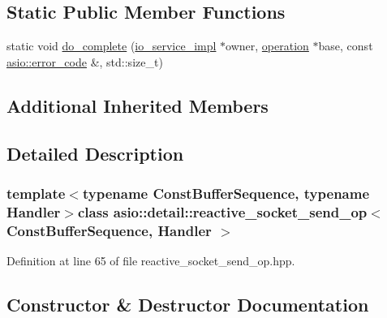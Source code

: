 \subsection*{Static Public Member Functions}
\begin{DoxyCompactItemize}
\item 
static void \hyperlink{classasio_1_1detail_1_1reactive__socket__send__op_a58c8c98f85f44f3c21374280dd473802}{do\+\_\+complete} (\hyperlink{namespaceasio_1_1detail_a6d61d9b8e53c11288be549d82aec5a42}{io\+\_\+service\+\_\+impl} $\ast$owner, \hyperlink{namespaceasio_1_1detail_a338968609bec20e37145309f8f9ec936}{operation} $\ast$base, const \hyperlink{classasio_1_1error__code}{asio\+::error\+\_\+code} \&, std\+::size\+\_\+t)
\end{DoxyCompactItemize}
\subsection*{Additional Inherited Members}


\subsection{Detailed Description}
\subsubsection*{template$<$typename Const\+Buffer\+Sequence, typename Handler$>$class asio\+::detail\+::reactive\+\_\+socket\+\_\+send\+\_\+op$<$ Const\+Buffer\+Sequence, Handler $>$}



Definition at line 65 of file reactive\+\_\+socket\+\_\+send\+\_\+op.\+hpp.



\subsection{Constructor \& Destructor Documentation}
\hypertarget{classasio_1_1detail_1_1reactive__socket__send__op_a1b0741219b5a6c6158d87bcf69cc2984}{}
